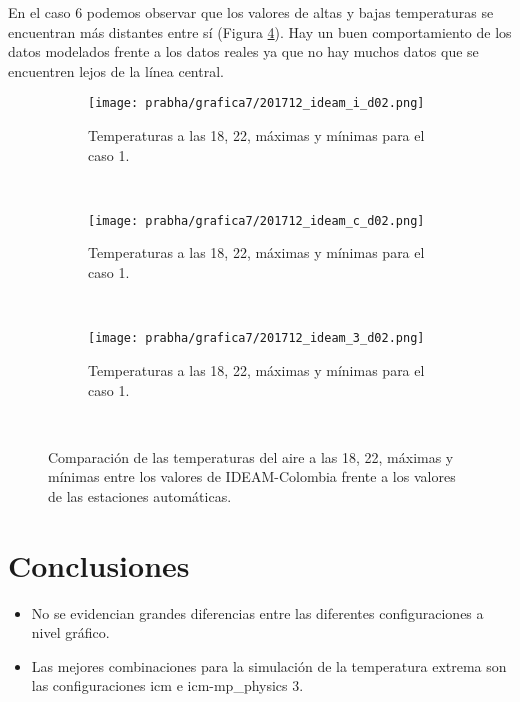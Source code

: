 En el caso 6 podemos observar que los valores de altas y bajas temperaturas se encuentran más distantes entre sí (Figura \ref{subfig:tmp_ext_caso6}). Hay un buen comportamiento de los datos modelados frente a los datos reales ya que no hay muchos datos que se encuentren lejos de la línea central.\\

\begin{figure}[H]
    \centering
    \begin{subfigure}[b]{0.45\textwidth}
        \caption{Temperaturas a las 18, 22, máximas y mínimas para el caso 1.}
	\texttt{[image: prabha/grafica7/201712\_ideam\_i\_d02.png]}
    \label{subfig:tmp_ext_caso6_d01}
	\end{subfigure}
	~
	    \begin{subfigure}[b]{0.45\textwidth}
        \caption{Temperaturas a las 18, 22, máximas y mínimas para el caso 1.}
	\texttt{[image: prabha/grafica7/201712\_ideam\_c\_d02.png]}

    \label{subfig:tmp_ext_caso6_d01}
	\end{subfigure}
	~
	    \begin{subfigure}[b]{0.45\textwidth}
        \caption{Temperaturas a las 18, 22, máximas y mínimas para el caso 1.}
	\texttt{[image: prabha/grafica7/201712\_ideam\_3\_d02.png]}
    \label{subfig:tmp_ext_caso6_d01}
	\end{subfigure}
	~



\caption{Comparación de las temperaturas del aire a las 18, 22, máximas y mínimas entre los valores de IDEAM-Colombia frente a los valores de las estaciones automáticas.}	
\label{subfig:tmp_ext_caso6}	
\end{figure}




\section{Conclusiones}

\begin{itemize}

    \item No se evidencian grandes diferencias entre las diferentes configuraciones a nivel gráfico.
    
    \item Las mejores combinaciones para la simulación de la temperatura extrema son las configuraciones icm e icm-mp\_physics 3.
\end{itemize}
